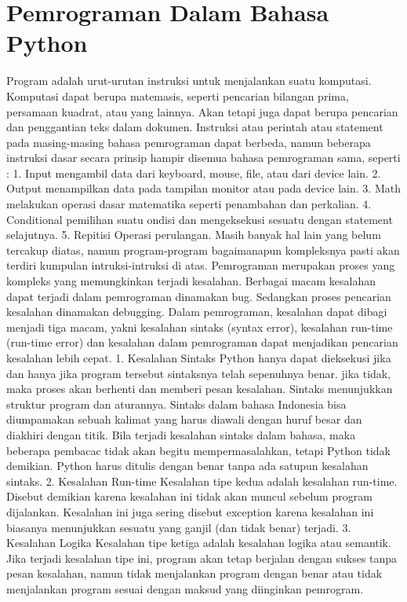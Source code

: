    	\section {Pemrograman Dalam Bahasa Python}
	Program adalah urut-urutan instruksi untuk menjalankan suatu komputasi. Komputasi dapat berupa matemasis, seperti
	pencarian bilangan prima, persamaan kuadrat, atau yang lainnya. Akan tetapi juga dapat berupa
	pencarian dan penggantian teks dalam dokumen. Instruksi atau perintah atau statement
	pada masing-masing bahasa pemrograman dapat berbeda, namun beberapa instruksi dasar
	secara prinsip hampir disemua bahasa pemrograman sama, seperti :
	1. Input
	mengambil data dari keyboard, mouse, file, atau dari device lain.
	2. Output
	menampilkan data pada tampilan monitor atau pada device lain.
	3. Math
	melakukan operasi dasar matematika seperti penambahan dan perkalian.
	4. Conditional
	pemilihan suatu ondisi dan mengeksekusi sesuatu dengan statement selajutnya.
	5. Repitisi
	Operasi perulangan.
      	Masih banyak hal lain yang belum tercakup diatas, namun program-program bagaimanapun kompleksnya pasti akan terdiri
      	kumpulan intruksi-intruksi di atas.
	Pemrograman merupakan proses yang kompleks yang memungkinkan terjadi kesalahan.
	Berbagai macam kesalahan dapat terjadi dalam pemrograman dinamakan bug. Sedangkan proses pencarian kesalahan dinamakan
	debugging. Dalam pemrograman, kesalahan dapat dibagi menjadi tiga macam, yakni kesalahan sintaks (syntax error), kesalahan run-time (run-time error)
	dan kesalahan dalam pemrograman dapat menjadikan pencarian kesalahan lebih cepat.
	1. Kesalahan Sintaks
	   Python hanya dapat dieksekusi jika dan hanya jika program tersebut sintaksnya telah sepenuhnya benar.
	   jika tidak, maka proses akan berhenti dan memberi pesan kesalahan. Sintaks menunjukkan struktur program dan aturannya.
	   Sintaks dalam bahasa Indonesia bisa diumpamakan sebuah kalimat yang harus diawali dengan huruf besar dan 
	   diakhiri dengan titik. Bila terjadi kesalahan sintaks dalam bahasa, maka beberapa pembacac tidak akan begitu mempermasalahkan, tetapi Python
	   tidak demikian. Python harus ditulis dengan benar tanpa ada satupun kesalahan sintaks.
	2. Kesalahan Run-time
	   Kesalahan tipe kedua adalah kesalahan run-time. Disebut demikian karena kesalahan ini tidak akan muncul sebelum program dijalankan.
	   Kesalahan ini juga sering disebut exception karena kesalahan ini biasanya menunjukkan sesuatu yang ganjil (dan tidak benar) terjadi.
	3. Kesalahan Logika 
	   Kesalahan tipe ketiga adalah kesalahan logika atau semantik. Jika terjadi kesalahan tipe ini, program akan tetap berjalan dengan sukses tanpa 
	   pesan kesalahan, namun tidak menjalankan program dengan benar atau tidak menjalankan program sesuai dengan
	   maksud yang diinginkan pemrogram.
	   
